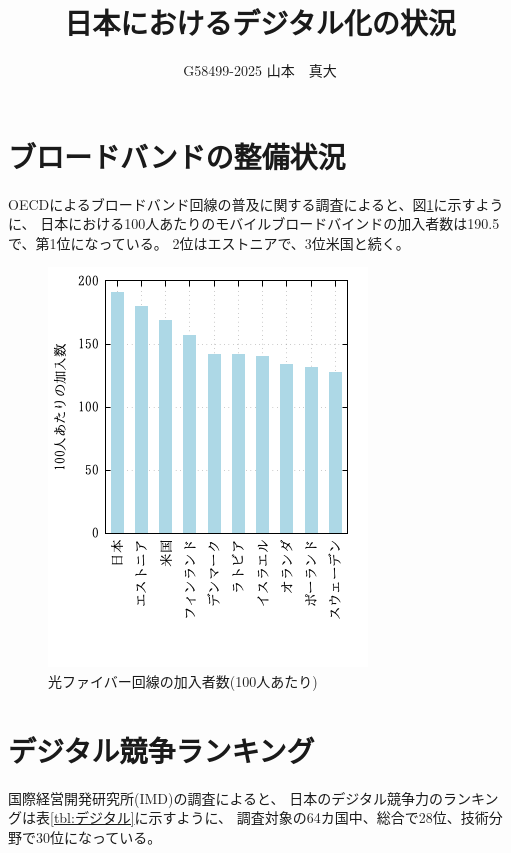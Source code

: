 \documentclass[a4paper,11pt,dvipdfmx]{ujarticle}
\title{日本におけるデジタル化の状況}
\author{G58499-2025 山本　真大}
\begin{document}
\maketitle 

\section{ブロードバンドの整備状況}

OECDによるブロードバンド回線の普及に関する調査\cite{oecd}によると、図\ref{fig:1}に示すように、
日本における100人あたりのモバイルブロードバインドの加入者数は190.5で、第1位になっている。
2位はエストニアで、3位米国と続く。

\begin{figure}[htbp]
    \centering
    \includegraphics[width=0.5\linewidth]{img2.png}
    \caption{光ファイバー回線の加入者数(100人あたり)}\label{fig:1}
\end{figure}

\section{デジタル競争ランキング}

国際経営開発研究所(IMD)の調査\cite{imd}によると、
日本のデジタル競争力のランキングは表\ref{tbl:デジタル}に示すように、
調査対象の64カ国中、総合で28位、技術分野で30位になっている。
\end{document}
